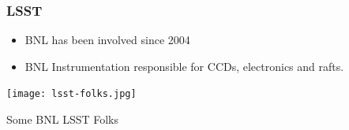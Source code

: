 \documentclass{beamer}
\begin{document}
\frame
{
    \frametitle{LSST}


            \begin{itemize}

                \item BNL has been involved since 2004

                \item BNL Instrumentation responsible for CCDs, electronics
                    and rafts.


            \end{itemize}
            \centerline{\texttt{[image: lsst-folks.jpg]}}
            \hfill {\tiny Some BNL LSST Folks}
}
\end{document}

